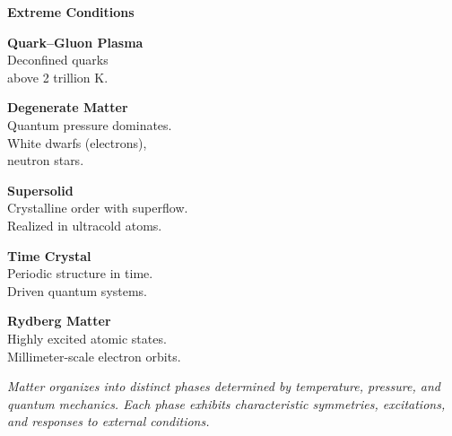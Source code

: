 \begin{tcolorbox}
\begin{multicols}{2}
\colorbox{blue!15}{\textbf{\large Extreme Conditions}}\vspace{3pt}

\textbf{Quark–Gluon Plasma}\\
{\footnotesize Deconfined quarks\\above 2 trillion K.}\vspace{6pt}

\textbf{Degenerate Matter}\\
{\footnotesize Quantum pressure dominates.\\White dwarfs (electrons),\\neutron stars.}\vspace{6pt}

\textbf{Supersolid}\\
{\footnotesize Crystalline order with superflow.\\Realized in ultracold atoms.}\vspace{6pt}

\textbf{Time Crystal}\\
{\footnotesize Periodic structure in time.\\Driven quantum systems.}\vspace{6pt}

\textbf{Rydberg Matter}\\
{\footnotesize Highly excited atomic states.\\Millimeter-scale electron orbits.}

\end{multicols}

\vfill
{\footnotesize\color{blue!70}\textit{Matter organizes into distinct phases determined by temperature, pressure, and quantum mechanics. Each phase exhibits characteristic symmetries, excitations, and responses to external conditions.}}

\end{tcolorbox}
    